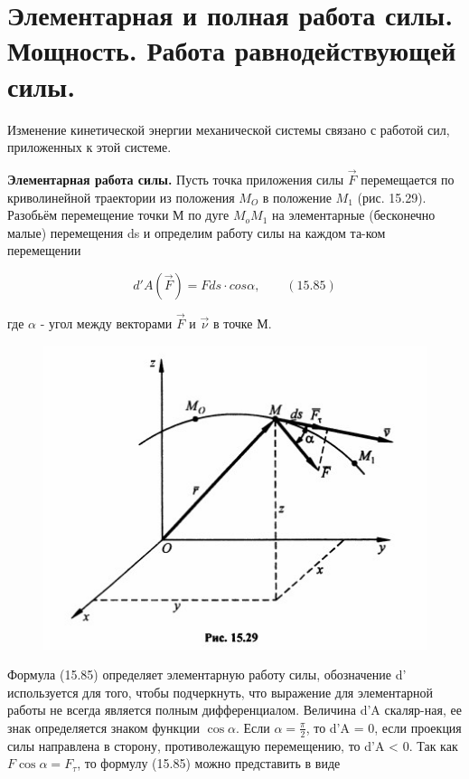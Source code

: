 {%
\section{Элементарная и полная работа силы. Мощность. Работа равнодействующей силы.}
\begin{center}
    \par Изменение кинетической энергии механической системы связано с работой сил, приложенных к этой системе.
	  \par\textbf{Элементарная работа силы.} Пусть точка приложения силы $\vec F$ перемещается по криволинейной траектории из положения $M_O$ в положение $M_1$ (рис. 15.29). Разобьём перемещение точки М по дуге $M_o M_1$ на элементарные (бесконечно малые) перемещения ds и определим работу силы на каждом та-ком перемещении

	  $$d' A(\vec F) = F ds \cdot cos{\alpha}, \qquad (15.85)$$

	  \par где $\alpha$ - угол между векторами $\vec F$ и $\vec\nu$ в точке М.

     \par \begin{figure}[H]
     \centering\includegraphics[scale=0.7]{img/15.29.jpg} 
     \end{figure}

	  \par Формула (15.85) определяет элементарную работу силы, обозначение d' используется для того, чтобы подчеркнуть, что выражение для элементарной работы не всегда является полным дифференциалом. Величина d'A скаляр-ная, ее знак определяется знаком  функции $\cos{\alpha}$. Если $\alpha = \frac{\pi}{2}$, то d'A = 0, если проекция силы направлена в сторону, противолежащую перемещению, то d'A < 0. Так как $F\cos{\alpha} =F_{\tau}$, то формулу (15.85) можно представить в виде


\end{center}}
